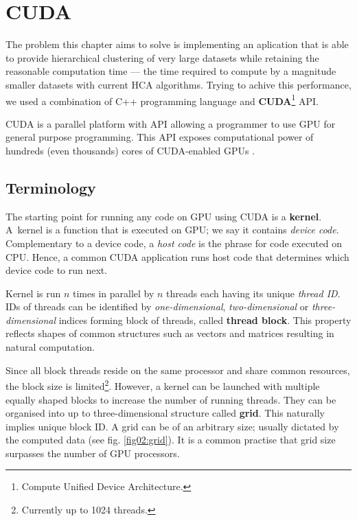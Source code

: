 \chapter{CUDA}

The problem this chapter aims to solve is implementing an aplication that is able to provide hierarchical clustering of very large datasets while retaining the reasonable computation time --- the time required to compute by a magnitude smaller datasets with current HCA algorithms.
Trying to achive this performance, we used a combination of C++ programming language and \textbf{CUDA}\footnote{Compute Unified Device Architecture.} API.

CUDA is a parallel platform with API allowing a programmer to use GPU for general purpose programming. This API exposes computational power of hundreds (even thousands) cores of CUDA-enabled GPUs \cite{cuda}.


\section{Terminology}

The starting point for running any code on GPU using CUDA is a \textbf{kernel}. A~kernel is a function that is executed on GPU; we say it contains \emph{device code}. Complementary to a device code, a \emph{host code} is the phrase for code executed on CPU. Hence, a common CUDA application runs host code that determines which device code to run next. 

Kernel is run $n$ times in parallel by $n$ threads each having its unique \emph{thread ID}. IDs of threads can be identified by \emph{one-dimensional}, \emph{two-dimensional} or \emph{three-dimensional} indices forming block of threads, called \textbf{thread block}. This property reflects shapes of common structures such as vectors and matrices resulting in natural computation.

Since all block threads reside on the same processor and share common resources, the block size is limited\footnote{Currently up to 1024 threads.}. However, a kernel can be launched with multiple equally shaped blocks to increase the number of running threads. They can be organised into up to three-dimensional structure called \textbf{grid}. This naturally implies unique block ID. A grid can be of an arbitrary size; usually dictated by the computed data (see fig. \ref{fig02:grid}). It is a common practise that grid size surpasses the number of GPU processors.



